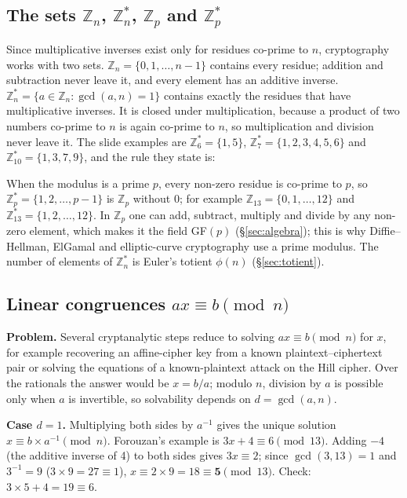 \subsection{The sets \texorpdfstring{$\mathbb{Z}_n$, $\mathbb{Z}_n^*$, $\mathbb{Z}_p$ and $\mathbb{Z}_p^*$}{Zn, Zn*, Zp, Zp*}}
Since multiplicative inverses exist only for residues co-prime to $n$, cryptography works with two sets. $\mathbb{Z}_n = \{0, 1, \dots, n-1\}$ contains every residue; addition and subtraction never leave it, and every element has an additive inverse. $\mathbb{Z}_n^* = \{a \in \mathbb{Z}_n : \gcd(a, n) = 1\}$ contains exactly the residues that have multiplicative inverses. It is closed under multiplication, because a product of two numbers co-prime to $n$ is again co-prime to $n$, so multiplication and division never leave it. The slide examples are $\mathbb{Z}_6^* = \{1, 5\}$, $\mathbb{Z}_7^* = \{1, 2, 3, 4, 5, 6\}$ and $\mathbb{Z}_{10}^* = \{1, 3, 7, 9\}$, and the rule they state is: 

When the modulus is a prime $p$, every non-zero residue is co-prime to $p$, so $\mathbb{Z}_p^* = \{1, 2, \dots, p-1\}$ is $\mathbb{Z}_p$ without 0; for example $\mathbb{Z}_{13} = \{0, 1, \dots, 12\}$ and $\mathbb{Z}_{13}^* = \{1, 2, \dots, 12\}$. In $\mathbb{Z}_p$ one can add, subtract, multiply and divide by any non-zero element, which makes it the field GF$(p)$ (\S\ref{sec:algebra}); this is why Diffie--Hellman, ElGamal and elliptic-curve cryptography use a prime modulus. The number of elements of $\mathbb{Z}_n^*$ is Euler's totient $\phi(n)$ (\S\ref{sec:totient}).

\subsection{Linear congruences \texorpdfstring{$ax \equiv b \pmod n$}{ax = b (mod n)}}
\textbf{Problem.} Several cryptanalytic steps reduce to solving $ax \equiv b \pmod n$ for $x$, for example recovering an affine-cipher key from a known plaintext--ciphertext pair or solving the equations of a known-plaintext attack on the Hill cipher. Over the rationals the answer would be $x = b/a$; modulo $n$, division by $a$ is possible only when $a$ is invertible, so solvability depends on $d = \gcd(a, n)$.

\textbf{Case $d = 1$.} Multiplying both sides by $a^{-1}$ gives the unique solution $x \equiv b \times a^{-1} \pmod n$. Forouzan's example is $3x + 4 \equiv 6 \pmod{13}$. Adding $-4$ (the additive inverse of 4) to both sides gives $3x \equiv 2$; since $\gcd(3, 13) = 1$ and $3^{-1} = 9$ ($3 \times 9 = 27 \equiv 1$), $x \equiv 2 \times 9 = 18 \equiv \mathbf{5} \pmod{13}$. Check: $3 \times 5 + 4 = 19 \equiv 6$.

